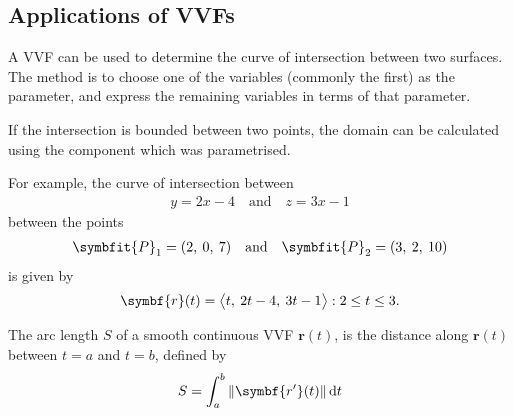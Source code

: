 \documentclass{article}
\begin{document}
\subsection{Applications of VVFs}
\begin{theorem}
    A VVF can be used to determine the curve of intersection between two
    surfaces. The method is to choose one of the variables (commonly the first)
    as the parameter, and express the remaining variables in terms of that parameter.

    If the intersection is bounded between two points, the domain can be
    calculated using the component which was parametrised.

    For example, the curve of intersection between
    \begin{align*}
        y = 2x - 4 \quad \text{and} \quad z = 3x - 1
    \end{align*}
    between the points
    \begin{align*}
        \symbfit{P}_1 = (2,\: 0,\: 7) \quad \text{and} \quad \symbfit{P}_2 = (3,\: 2,\: 10)
    \end{align*}
    is given by
    \begin{equation*}
        \symbf{r}(t) = \avec[\big]{t,\: 2t - 4,\: 3t - 1} : 2 \leq t \leq 3.
    \end{equation*}
\end{theorem}
\begin{definition}
    The arc length \(S\) of a smooth continuous VVF \(\symbf{r}(t)\), is the distance along \(\symbf{r}(t)\)
    between \(t=a\) and \(t=b\), defined by
    \begin{equation*}
        S = \int_a^b \norm{\symbf{r'}(t)} \dd{t}
    \end{equation*}
\end{definition}
\newpage
\end{document}
